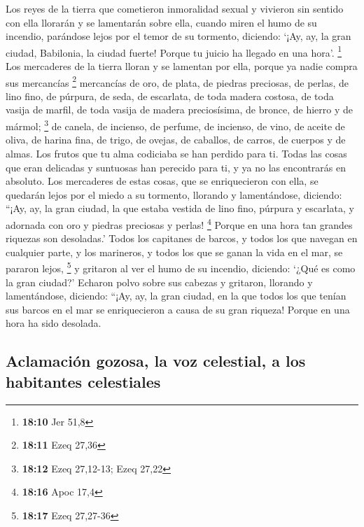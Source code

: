 \begin{paracol}{2}
 Los reyes de la tierra que cometieron inmoralidad sexual
y vivieron sin sentido con ella llorarán y se lamentarán sobre ella,
cuando miren el humo de su incendio,  parándose lejos por
el temor de su tormento, diciendo: `¡Ay, ay, la gran ciudad, Babilonia,
la ciudad fuerte! Porque tu juicio ha llegado en una hora'. \footnote{\textbf{18:10}
  Jer 51,8}  Los mercaderes de la tierra lloran y se
lamentan por ella, porque ya nadie compra sus mercancías \footnote{\textbf{18:11}
  Ezeq 27,36}  mercancías de oro, de plata, de piedras
preciosas, de perlas, de lino fino, de púrpura, de seda, de escarlata,
de toda madera costosa, de toda vasija de marfil, de toda vasija de
madera preciosísima, de bronce, de hierro y de mármol; \footnote{\textbf{18:12}
  Ezeq 27,12-13; Ezeq 27,22}  de canela, de incienso, de
perfume, de incienso, de vino, de aceite de oliva, de harina fina, de
trigo, de ovejas, de caballos, de carros, de cuerpos y de almas.
 Los frutos que tu alma codiciaba se han perdido para ti.
Todas las cosas que eran delicadas y suntuosas han perecido para ti, y
ya no las encontrarás en absoluto.  Los mercaderes de
estas cosas, que se enriquecieron con ella, se quedarán lejos por el
miedo a su tormento, llorando y lamentándose,  diciendo:
``¡Ay, ay, la gran ciudad, la que estaba vestida de lino fino, púrpura y
escarlata, y adornada con oro y piedras preciosas y perlas! \footnote{\textbf{18:16}
  Apoc 17,4}  Porque en una hora tan grandes riquezas son
desoladas.' Todos los capitanes de barcos, y todos los que navegan en
cualquier parte, y los marineros, y todos los que se ganan la vida en el
mar, se pararon lejos, \footnote{\textbf{18:17} Ezeq 27,27-36}
 y gritaron al ver el humo de su incendio, diciendo:
`¿Qué es como la gran ciudad?'  Echaron polvo sobre sus
cabezas y gritaron, llorando y lamentándose, diciendo: ``¡Ay, ay, la
gran ciudad, en la que todos los que tenían sus barcos en el mar se
enriquecieron a causa de su gran riqueza! Porque en una hora ha sido
desolada.

\hypertarget{aclamaciuxf3n-gozosa-la-voz-celestial-a-los-habitantes-celestiales}{%
\subsection{Aclamación gozosa, la voz celestial, a los habitantes
celestiales}\label{aclamaciuxf3n-gozosa-la-voz-celestial-a-los-habitantes-celestiales}}


\end{paracol}
